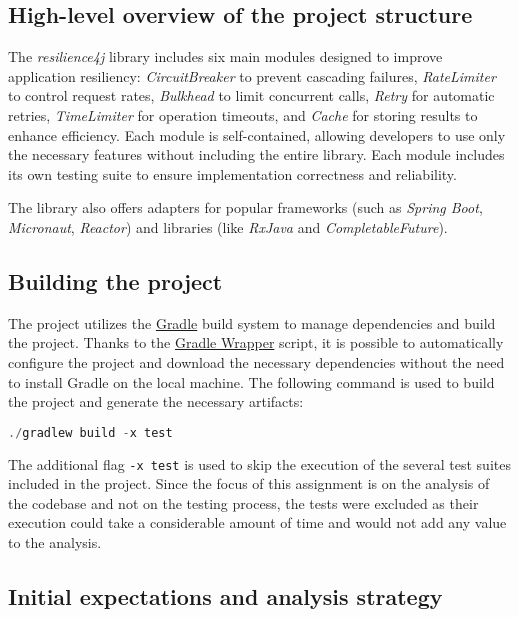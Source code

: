 \subsection{High-level overview of the project structure}

The \textit{resilience4j} library includes six main modules designed to improve application resiliency: \textit{CircuitBreaker} to prevent cascading failures, \textit{RateLimiter} to control request rates, \textit{Bulkhead} to limit concurrent calls, \textit{Retry} for automatic retries, \textit{TimeLimiter} for operation timeouts, and \textit{Cache} for storing results to enhance efficiency. Each module is self-contained, allowing developers to use only the necessary features without including the entire library. Each module includes its own testing suite to ensure implementation correctness and reliability.

The library also offers adapters for popular frameworks (such as \textit{Spring Boot}, \textit{Micronaut}, \textit{Reactor}) and libraries (like \textit{RxJava} and \textit{CompletableFuture}).

\subsection{Building the project}

The project utilizes the \href{https://gradle.org/}{Gradle} build system to manage dependencies and build the project. Thanks to the \href{https://docs.gradle.org/current/userguide/gradle_wrapper.html}{Gradle Wrapper} script, it is possible to automatically configure the project and download the necessary dependencies without the need to install Gradle on the local machine. The following command is used to build the project and generate the necessary artifacts:

\begin{lstlisting}[language=C++, caption=Building the project]
                          ./gradlew build -x test
\end{lstlisting}

The additional flag \texttt{-x test} is used to skip the execution of the several test suites included in the project. Since the focus of this assignment is on the analysis of the codebase and not on the testing process, the tests were excluded as their execution could take a considerable amount of time and would not add any value to the analysis.

\subsection{Initial expectations and analysis strategy}
\label{sec:initial_expectations}

